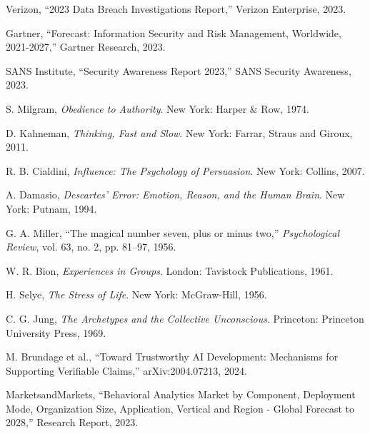 \documentclass[10pt,twocolumn]{IEEEtran}
\begin{document}
\begin{thebibliography}{99}

Verizon, ``2023 Data Breach Investigations Report,'' Verizon Enterprise, 2023.

Gartner, ``Forecast: Information Security and Risk Management, Worldwide, 2021-2027,'' Gartner Research, 2023.

SANS Institute, ``Security Awareness Report 2023,'' SANS Security Awareness, 2023.

S. Milgram, \emph{Obedience to Authority}. New York: Harper \& Row, 1974.

D. Kahneman, \emph{Thinking, Fast and Slow}. New York: Farrar, Straus and Giroux, 2011.

R. B. Cialdini, \emph{Influence: The Psychology of Persuasion}. New York: Collins, 2007.

A. Damasio, \emph{Descartes' Error: Emotion, Reason, and the Human Brain}. New York: Putnam, 1994.

G. A. Miller, ``The magical number seven, plus or minus two,'' \emph{Psychological Review}, vol. 63, no. 2, pp. 81--97, 1956.

W. R. Bion, \emph{Experiences in Groups}. London: Tavistock Publications, 1961.

H. Selye, \emph{The Stress of Life}. New York: McGraw-Hill, 1956.

C. G. Jung, \emph{The Archetypes and the Collective Unconscious}. Princeton: Princeton University Press, 1969.

M. Brundage et al., ``Toward Trustworthy AI Development: Mechanisms for Supporting Verifiable Claims,'' arXiv:2004.07213, 2024.

MarketsandMarkets, ``Behavioral Analytics Market by Component, Deployment Mode, Organization Size, Application, Vertical and Region - Global Forecast to 2028,'' Research Report, 2023.

\end{thebibliography}
\end{document}
